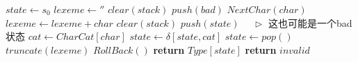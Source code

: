 \documentclass[varwidth=\maxdimen]{standalone}
\newcommand{\LeftComment}[1]{$\quad\triangleright$ #1}
\begin{document}
\begin{algorithmic}[1]
  \State $state \gets s_0$
  \State $lexeme \gets ''$
  \State $clear(stack)$
  \State $push(bad)$
    \State $NextChar(char)$
    \State $lexeme \gets lexeme+char$
      \State $clear(stack)$
    \EndIf
    \State $push(state)$ \LeftComment{这也可能是一个bad状态}
    \State $cat \gets CharCat[char]$
    \State $state \gets \delta[state,cat]$
  \EndWhile
    \State $state \gets pop()$
    \State $truncate(lexeme)$
    \State $RollBack()$
  \EndWhile
    \State \textbf{return} $Type[state]$
  \Else
    \State \textbf{return} $invalid$
  \EndIf
  \EndProcedure
\end{algorithmic}
\end{document}
